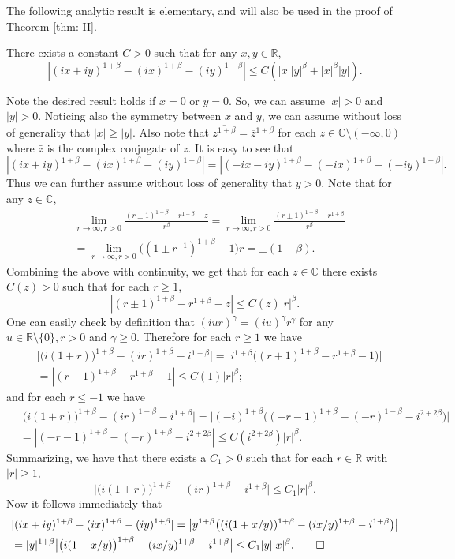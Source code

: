 \documentclass{amse-new}
\numberwithin{equation}{section}
\begin{document}
	The following analytic result is elementary, and will also be used in the proof of Theorem \ref{thm: II}.
\begin{lemma} \label{ineq: analysis}
	There exists a constant $C>0$ such that for any $x,y \in \mathbb R$,
\[
    |(ix+iy)^{1+\beta}-(ix)^{1+\beta}-(iy)^{1+\beta}|
    \leq C(|x||y|^{\beta}+|x|^{\beta}|y|).
\]
\end{lemma}
\begin{prof}
   	Note the desired result holds if $x =0$ or $y = 0$.
   	So, we can assume $|x|>0$ and $|y|>0$.
   	Noticing also the symmetry between $x$ and $y$, we can assume without loss of generality that $|x|\geq |y|$.
   	Also note that $\overline{ z^{1+\beta}} = \overline z^{1+\beta}$ for each $z \in \mathbb C \setminus (-\infty, 0)$
   	where $\bar z$ is the complex conjugate of $z$.
It is easy to see that
\[
	|(ix+iy)^{1+\beta}-(ix)^{1+\beta}-(iy)^{1+\beta}|
	= |(-ix-iy)^{1+\beta}-(-ix)^{1+\beta}-(-iy)^{1+\beta}|.
\]
Thus we can further assume without loss of generality that $y>0$.
	Note that for any $z\in \mathbb C$,
\begin{align}
  	&\lim_{r \to \infty, r>0}\frac{(r\pm 1)^{1+\beta}-r^{1+\beta} - z}{r^{\beta}}
  	=\lim_{r\to \infty, r > 0}\frac{(r\pm1)^{1+\beta}-r^{1+\beta}}{r^{\beta}}
  	\\&=\lim_{r\to \infty,r>0}\big((1\pm r^{-1})^{1+\beta}-1\big)r = \pm(1+\beta).
\end{align}
	Combining the above with continuity, we get that for each $z\in \mathbb C$ there exists $C(z)>0$ such that for each $r\geq 1$,
\[
  	|(r\pm 1)^{1+\beta}-r^{1+\beta} - z|
  	\leq C(z) |r|^{\beta}.
\]
	One can easily check by definition that $(iur)^{\gamma} = (iu)^{\gamma} r^{\gamma}$ for  any $u\in \mathbb R\setminus\{0\}, r>0$ and $\gamma \geq 0$.
	Therefore for each $r\geq 1$ we have
\begin{align}
	&\big|\big(i(1+ r)\big)^{1+\beta} - (ir)^{1+\beta} - i^{1+\beta}\big|
	= \big|i^{1+\beta} \big((r+1)^{1+\beta} - r^{1+\beta} - 1\big)\big|
	\\&= |(r+1)^{1+\beta}-r^{1+\beta}-1|
	\leq C(1) |r|^{\beta};
\end{align}
and for each $r\leq -1$ we have
\begin{align}
	&\big|\big( i (1+ r)\big)^{1+\beta} - (ir)^{1+\beta} - i^{1+\beta}\big|
	= \big|(-i)^{1+\beta} \big((-r - 1)^{1+\beta} - (-r)^{1+\beta} - i^{2+2\beta}\big)\big|
	\\&= |(-r-1)^{1+\beta}-(-r)^{1+\beta}  - i^{2+2\beta}|
	\leq C(i^{2+2\beta}) |r|^{\beta}.
\end{align}
Summarizing, we have that there exists a $C_1>0$ such that for each $r\in \mathbb R$ with $|r|\geq 1$,
\[
	\big|\big( i(1+ r)\big)^{1+\beta} - (ir)^{1+\beta} - i^{1+\beta}\big| \leq C_1 |r|^\beta.
\]
Now it follows immediately that
\begin{align}
	&|(ix+iy)^{1+\beta}-(ix)^{1+\beta}-(iy)^{1+\beta}|
	= \big|y^{1+\beta}\big(
	(i(1+x/y))^{1+\beta}
	-(ix/y)^{1+\beta}- i^{1+\beta}\big)\big|
	\\&= |y|^{1+\beta}\big|\big(i(1+x/y)\big)^{1+\beta}-(ix/y)^{1+\beta}-i^{1+\beta}\big|
	\leq C_1|y||x|^{\beta}.
	\qedhere
\end{align}
\end{prof}
\end{document}
